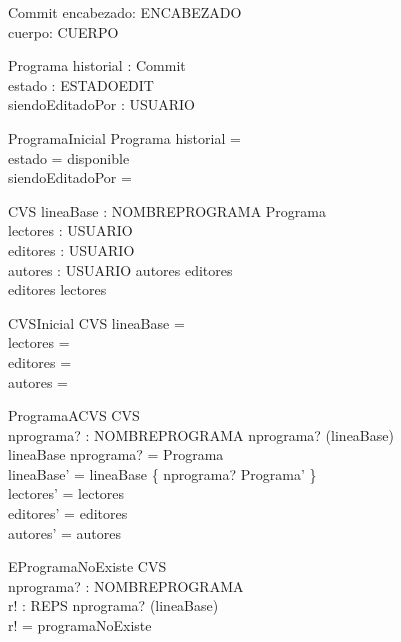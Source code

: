 \documentclass[11pt]{article}
\begin{document}
  \begin{schema}{Commit}
  encabezado: ENCABEZADO \\
  cuerpo: CUERPO
  \end{schema}
  
  \begin{schema}{Programa}
  historial : \seq Commit \\
  estado : ESTADOEDIT \\
  siendoEditadoPor : \power USUARIO
  \end{schema}
  
  \begin{schema}{ProgramaInicial}
  Programa
  \where
  historial = \emptyset \\
  estado = disponible \\
  siendoEditadoPor = \emptyset
  \end{schema}
  
  \begin{schema}{CVS}
  lineaBase : NOMBREPROGRAMA \pfun Programa \\
  lectores : \power USUARIO \\
  editores : \power USUARIO \\
  autores : \power USUARIO 
  \where
  autores \subseteq editores \\
  editores \subseteq lectores
  \end{schema}
  
  \begin{schema}{CVSInicial}
  CVS
  \where
  lineaBase = \emptyset \\
  lectores = \emptyset \\
  editores = \emptyset \\
  autores = \emptyset
  \end{schema}
  
  \begin{schema}{ProgramaACVS}
  \Delta CVS \\
  nprograma? : NOMBREPROGRAMA
  \where
  nprograma? \in (\dom lineaBase) \\
  lineaBase \; nprograma? = \theta Programa \\
  lineaBase' = lineaBase \oplus \{ nprograma? \mapsto \theta Programa' \} \\
  lectores' = lectores \\
  editores' = editores \\
  autores' = autores
  \end{schema}
  
  \begin{schema}{EProgramaNoExiste}
  \Xi CVS \\
  nprograma? : NOMBREPROGRAMA \\
  r! : REPS
  \where
  nprograma? \notin (\dom lineaBase) \\
  r! = programaNoExiste
  \end{schema}
  
\end{document}
